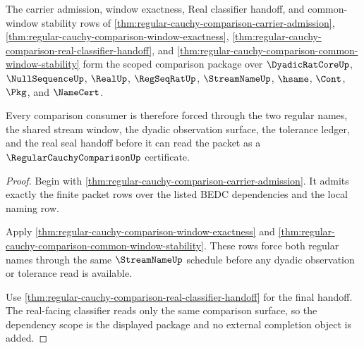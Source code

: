 \begin{theorem}
\label{thm:regular-cauchy-comparison-dependency-scope}
The carrier admission, window exactness, Real classifier handoff, and common-window stability rows of \autoref{thm:regular-cauchy-comparison-carrier-admission}, \autoref{thm:regular-cauchy-comparison-window-exactness}, \autoref{thm:regular-cauchy-comparison-real-classifier-handoff}, and \autoref{thm:regular-cauchy-comparison-common-window-stability} form the scoped comparison package over $\DyadicRatCoreUp$, $\NullSequenceUp$, $\RealUp$, $\RegSeqRatUp$, $\StreamNameUp$, $\hsame$, $\Cont$, $\Pkg$, and $\NameCert$.

Every comparison consumer is therefore forced through the two regular names, the shared stream window, the dyadic observation surface, the tolerance ledger, and the real seal handoff before it can read the packet as a $\RegularCauchyComparisonUp$ certificate.
\end{theorem}
\begin{proof}
Begin with \autoref{thm:regular-cauchy-comparison-carrier-admission}. It admits exactly the finite packet rows over the listed BEDC dependencies and the local naming row.

Apply \autoref{thm:regular-cauchy-comparison-window-exactness} and \autoref{thm:regular-cauchy-comparison-common-window-stability}. These rows force both regular names through the same $\StreamNameUp$ schedule before any dyadic observation or tolerance read is available.

Use \autoref{thm:regular-cauchy-comparison-real-classifier-handoff} for the final handoff. The real-facing classifier reads only the same comparison surface, so the dependency scope is the displayed package and no external completion object is added.
\end{proof}

